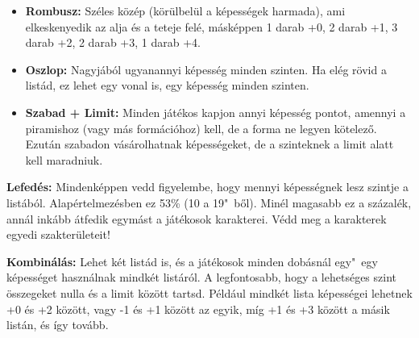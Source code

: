 \begin{itemize}
    \item \textbf{Rombusz:} Széles közép (körülbelül a képességek harmada), ami elkeskenyedik az alja és a teteje felé, másképpen 1 darab +0, 2 darab +1, 3 darab +2, 2 darab +3, 1 darab +4.
    \item \textbf{Oszlop:} Nagyjából ugyanannyi képesség minden szinten. Ha elég rövid a listád, ez lehet egy vonal is, egy képesség minden szinten.
    \item \textbf{Szabad + Limit:} Minden játékos kapjon annyi képesség pontot, amennyi a piramishoz (vagy más formációhoz) kell, de a forma ne legyen kötelező. Ezután szabadon vásárolhatnak képességeket, de a szinteknek a limit alatt kell maradniuk.
\end{itemize}

\textbf{Lefedés:} Mindenképpen vedd figyelembe, hogy mennyi képességnek lesz szintje a listából. Alapértelmezésben ez 53\% (10 a 19"~ből). Minél magasabb ez a százalék, annál inkább átfedik egymást a játékosok karakterei. Védd meg a karakterek egyedi szakterületeit!

\textbf{Kombinálás:} Lehet két listád is, és a játékosok minden dobásnál egy"~egy képességet használnak mindkét listáról. A legfontosabb, hogy a lehetséges szint összegeket nulla és a limit között tartsd. Például mindkét lista képességei lehetnek +0 és +2 között, vagy -1 és +1 között az egyik, míg +1 és +3 között a másik listán, és így tovább.

